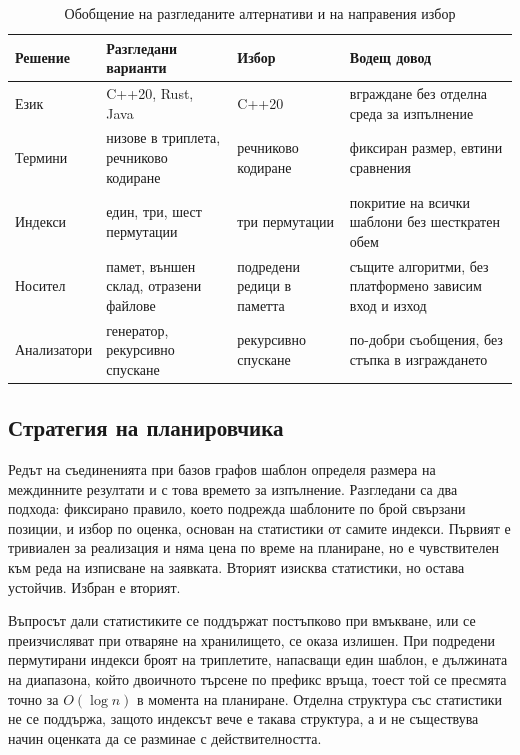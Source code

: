 \begin{table}[H]
\caption{Обобщение на разгледаните алтернативи и на направения избор}
\label{tab:alternatives}
\centering
\fontsize{10}{12}\selectfont
\begin{tabular}{@{}L{3.0cm}L{4.2cm}L{3.0cm}L{3.2cm}@{}}
\toprule
\textbf{Решение} & \textbf{Разгледани варианти} & \textbf{Избор} & \textbf{Водещ довод} \\
\midrule
Език & C++20, Rust, Java & C++20 & вграждане без отделна среда за изпълнение \\
Термини & низове в триплета, речниково кодиране & речниково кодиране & фиксиран размер, евтини сравнения \\
Индекси & един, три, шест пермутации & три пермутации & покритие на всички шаблони без шесткратен обем \\
Носител & памет, външен склад, отразени файлове & подредени редици в паметта & същите алгоритми, без платформено зависим вход и изход \\
Анализатори & генератор, рекурсивно спускане & рекурсивно спускане & по-добри съобщения, без стъпка в изграждането \\
\bottomrule
\end{tabular}
\end{table}

\subsection{Стратегия на планировчика}

Редът на съединенията при базов графов шаблон определя размера на междинните
резултати и с това времето за изпълнение. Разгледани са два подхода: фиксирано
правило, което подрежда шаблоните по брой свързани позиции, и избор по оценка,
основан на статистики от самите индекси. Първият е тривиален за реализация и няма
цена по време на планиране, но е чувствителен към реда на изписване на заявката.
Вторият изисква статистики, но остава устойчив. Избран е вторият.

Въпросът дали статистиките се поддържат постъпково при вмъкване, или се преизчисляват
при отваряне на хранилището, се оказа излишен. При подредени пермутирани индекси
броят на триплетите, напасващи един шаблон, е дължината на диапазона, който двоичното
търсене по префикс връща, тоест той се пресмята точно за $O(\log n)$ в момента на
планиране. Отделна структура със статистики не се поддържа, защото индексът вече е
такава структура, а и не съществува начин оценката да се разминае с действителността.
